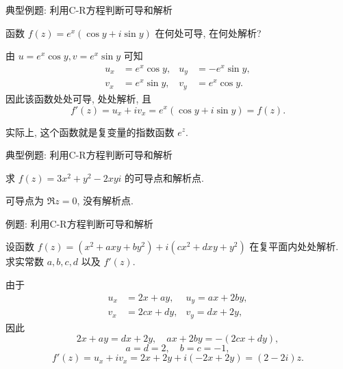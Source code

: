 \begin{frame}{典型例题: 利用C-R方程判断可导和解析}
\begin{example}
函数 $f(z)=e^x(\cos y+i\sin y)$ 在何处可导, 在何处解析?
\end{example}
\begin{solution}
由 $u=e^x\cos y,v=e^x\sin y$
\onslide<+->
可知
\begin{align*}
u_x&=e^x\cos y,&u_y&=-e^x\sin y,\\
v_x&=e^x\sin y,&v_y&=e^x\cos y.
\end{align*}
\onslide<+->
因此该函数处处可导, 处处解析, 且
\[f'(z)=u_x+iv_x=e^x(\cos y+i\sin y)=f(z).\]
\end{solution}
\onslide<+->
实际上, 这个函数就是复变量的指数函数 $e^z$.
\end{frame}


\begin{frame}{典型例题: 利用C-R方程判断可导和解析}
\begin{exercise}
求 $f(z)=3x^2+y^2-2xyi$ 的可导点和解析点.
\end{exercise}
\begin{answer}
可导点为 $\Re z=0$, 没有解析点.
\end{answer}
\end{frame}


\begin{frame}{例题: 利用C-R方程判断可导和解析}
\beqskip{4pt}
\begin{example}
设函数 $f(z)=(x^2+axy+by^2)+i(cx^2+dxy+y^2)$ 在复平面内处处解析. 求实常数 $a,b,c,d$ 以及 $f'(z)$.
\end{example}
\begin{solution}
由于
\begin{align*}
u_x&=2x+ay,&u_y=ax+2by,\\
v_x&=2cx+dy,&v_y=dx+2y,
\end{align*}
\onslide<+->
因此
\[2x+ay=dx+2y,\quad ax+2by=-(2cx+dy),\]
\vspace{-\baselineskip}
\onslide<+->
\[a=d=2,\quad b=c=-1,\]
\vspace{-\baselineskip}
\onslide<+->
\[f'(z)=u_x+iv_x=2x+2y+i(-2x+2y)=(2-2i)z.\]
\end{solution}
\endgroup
\end{frame}


